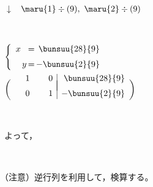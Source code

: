 \documentclass[a4paper,10pt,onecolumn,oneside,notitlepage,final]{jsarticle} %
\begin{document}
\begin{CKdata}
\begin{edaenumerate}
\item\ 
\item\ \item\ $\downarrow$ $\begin{array}{l}
\maru{1}\div(9),\ \maru{2}\div(9)
\end{array}$\\[-5mm]\item\ 
\item\ 
$\left\{\begin{array}{r@{\,}r@{\,=\,}r}
   x&    &\bunsuu{28}{9}\\[2mm]    &  y&-\bunsuu{2}{9}
\end{array}\right.$
\item\ 
$\left(\begin{array}{rr|r}
\hspace{6mm}&\hspace{6mm}&\hspace{6mm}\\[-7mm]
   1&   0&\bunsuu{28}{9}\\[2mm]   0&  1&-\bunsuu{2}{9}
\end{array}\right)$
\item\ \\[4mm]
\item\ \qquad よって，\item\ 
\end{edaenumerate}

\vspace{5mm}
（注意）逆行列を利用して，検算する。


\end{CKdata}
\end{document}
